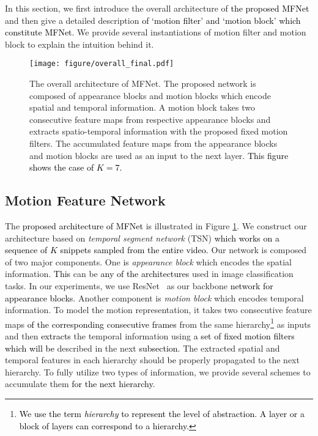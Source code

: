 \documentclass[runningheads]{llncs}
\newcommand{\nj}[1]{\textcolor{black}{#1}}
\newcommand{\mg}[1]{\textcolor{black}{#1}}
\begin{document}
In this section, we first introduce the overall architecture of \nj{the proposed MFNet} and then give a detailed description \nj{of `motion filter' and `motion block'} \nj{which constitute MFNet}. We provide several instantiations of motion filter and motion block to explain the intuition behind it. 

\begin{figure}[t]
	\centering
    \texttt{[image: figure/overall\_final.pdf]}
    \caption{The overall architecture of MFNet. The proposed network is composed of appearance blocks and motion blocks which encode spatial and temporal information. A motion block takes two consecutive feature maps from respective appearance blocks and extracts spatio-temporal information with the proposed fixed motion filters. The accumulated feature maps from the appearance blocks and motion blocks are used as an input to the next layer. \mg{This figure shows the case of $K=7$.}}
    \label{fig:arch}
\end{figure}

\subsection{Motion Feature Network}

The \nj{proposed architecture of MFNet} is illustrated in Figure \ref{fig:arch}. We construct our architecture based on \textit{temporal segment network} (TSN) \cite{wang2016temporal} \mg{which works on a sequence of $K$ snippets sampled from the entire video.} Our network is composed of two major components. One is \textit{appearance block} which encodes the spatial information. \nj{This} can be \nj{any of the architectures} used in image classification tasks. In our experiments, we use ResNet~\cite{he2016deep} as our backbone \nj{network for appearance blocks}. 
Another component is \textit{motion block} which encodes temporal information. To model the motion representation, it takes two consecutive feature maps \nj{of the corresponding consecutive frames} from the same hierarchy\footnote{\nj{We use the term \textit{hierarchy} to represent the level of abstraction. A layer or a block of layers can correspond to a hierarchy.} } as inputs and then \nj{extracts} the temporal information using \nj{a set of fixed motion filters which will be} described in the next \nj{subsection.} The extracted spatial and temporal features in each hierarchy should \nj{be} properly propagated to the next hierarchy. To fully utilize two types of information, we provide several schemes to accumulate them \nj{for the next hierarchy}.
\end{document}
